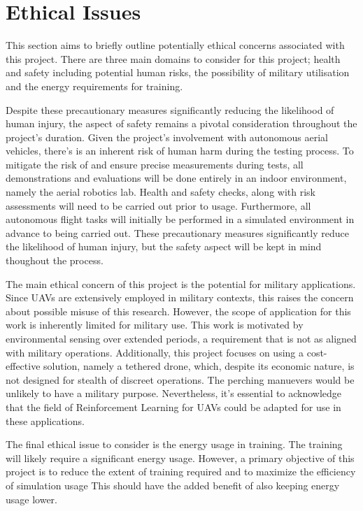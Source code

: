 \chapter{Ethical Issues}

This section aims to briefly outline potentially ethical concerns associated with this project.
There are three main domains to consider for this project; health and safety including potential human risks, the possibility of military utilisation and the energy requirements for training.

Despite these precautionary measures significantly reducing the likelihood of human injury, the aspect of safety remains a pivotal consideration throughout the project's duration.
Given the project's involvement with autonomous aerial vehicles, there's is an inherent risk of human harm during the testing process.
To mitigate the risk of and ensure precise measurements during tests, all demonstrations and evaluations will be done entirely in an indoor environment, namely the aerial robotics lab.
Health and safety checks, along with risk assessments will need to be carried out prior to usage.
Furthermore, all autonomous flight tasks will initially be performed in a simulated environment in advance to being carried out.
These precautionary measures significantly reduce the likelihood of human injury, but the safety aspect will be kept in mind thoughout the process.

The main ethical concern of this project is the potential for military applications.
Since UAVs are extensively employed in military contexts, this raises the concern about possible misuse of this research.
However, the scope of application for this work is inherently limited for military use.
This work is motivated by environmental sensing over extended periods, a requirement that is not as aligned with military operations.
Additionally, this project focuses on using a cost-effective solution, namely a tethered drone, which, despite its economic nature, is not designed for stealth of discreet operations.
The perching manuevers would  be unlikely to have a military purpose.
Nevertheless, it's essential to acknowledge that the field of Reinforcement Learning for UAVs could be adapted for use in these applications.

The final ethical issue to consider is the energy usage in training.
The training will likely require a significant energy usage.
However, a primary objective of this project is to reduce the extent of training required and to maximize the efficiency of simulation usage
This should have the added benefit of also keeping energy usage lower.
